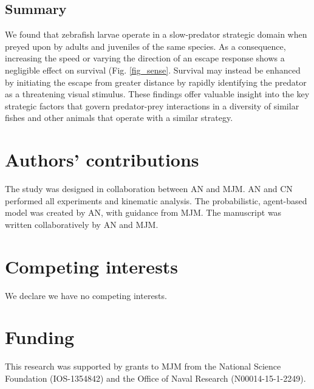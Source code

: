 \documentclass[]{rsos}%
\begin{document}
\subsection*{Summary} 

We found that zebrafish larvae operate in a slow-predator strategic domain when preyed upon by adults and juveniles of the same species.
As a consequence, increasing the speed or varying the direction of an escape response shows a negligible effect on survival (Fig. \ref{fig_sense}.
Survival may instead be enhanced by initiating the escape from greater distance by rapidly identifying the predator as a threatening visual stimulus.  
These findings offer valuable insight into the key strategic factors that govern predator-prey interactions in a diversity of similar fishes and other animals that operate with a similar strategy. 





\section*{Authors' contributions}

The study was designed in collaboration between AN and MJM.
AN and CN performed all experiments and kinematic analysis.
The probabilistic, agent-based model was created by AN, with guidance from MJM. 
The manuscript was written collaboratively by AN and MJM.

\section*{Competing interests}

We declare we have no competing interests.

\section*{Funding}

This research was supported by grants to MJM from the National Science Foundation (IOS-1354842) and the Office of Naval Research (N00014-15-1-2249).

\end{document}
